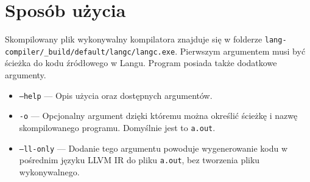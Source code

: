 \documentclass[declaration,shortabstract]{iithesis}
\begin{document}











\section{Sposób użycia}
Skompilowany plik wykonywalny kompilatora znajduje się w folderze \newline
\texttt{lang-compiler/\_build/default/langc/langc.exe}. Pierwszym argumentem 
musi być ścieżka do kodu źródłowego w Langu. Program posiada także dodatkowe 
argumenty. 

\begin{itemize}
  \item \texttt{--help} --- Opis użycia oraz dostępnych argumentów. 
  \item \texttt{-o} --- Opcjonalny argument dzięki któremu można określić 
  ścieżkę i nazwę skompilowanego programu. Domyślnie jest to \texttt{a.out}.
  \item \texttt{--ll-only} --- Dodanie tego argumentu powoduje wygenerowanie 
  kodu w pośrednim języku LLVM IR do pliku \texttt{a.out}, bez tworzenia pliku 
  wykonywalnego. 
\end{itemize}
\end{document}
